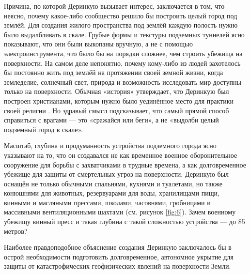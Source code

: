 \documentclass[10pt,twocolumn,letterpaper]{article}
\begin{document}

Причина, по которой Деринкую вызывает интерес, заключается в том, что неясно, почему какое-либо сообщество решило бы построить целый город под землёй. Для создания жилого пространства под землёй каждую полость нужно было выдалбливать в скале. Грубые формы и текстуры подземных туннелей ясно показывают, что они были выкопаны вручную, а не с помощью электроинструмента, что было бы на порядки сложнее, чем строить убежища на поверхности. На самом деле непонятно, почему кому-либо из людей захотелось бы постоянно жить под землёй на протяжении своей земной жизни, когда земледелие, солнечный свет, природа и возможность исследовать мир доступны только на поверхности. Обычная «история» утверждает, что Деринкую был построен христианами, которым нужно было уединённое место для практики своей религии \cite{53}. Но здравый смысл подсказывает, что самый прямой способ справиться с врагами — это «сражайся или беги», а не «выдолби целый подземный город в скале».

Масштаб, глубина и продуманность устройства подземного города ясно указывают на то, что он создавался не как временное военное оборонительное сооружение для борьбы с захватчиками в трудные времена, а как долговременное убежище для защиты от смертельных угроз на поверхности. Деринкую был оснащён не только обычными спальнями, кухнями и туалетами, но также конюшнями для животных, резервуарами для воды, хранилищами пищи, винными и масляными прессами, школами, часовнями, гробницами и массивными вентиляционными шахтами (см. рисунок \ref{fig:6}). Зачем военному убежищу винный пресс и такая глубина с такой сложностью устройства — до 85 метров?

Наиболее правдоподобное объяснение создания Деринкую заключалось бы в острой необходимости подготовить долговременное, автономное укрытие для защиты от катастрофических геофизических явлений на поверхности Земли.
\end{document}
